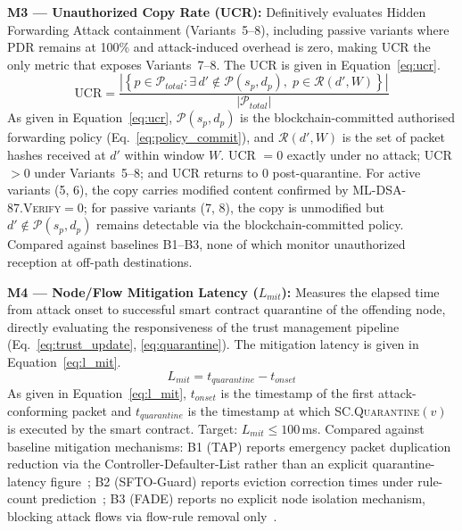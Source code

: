 \documentclass[12pt, a4paper]{report}
\begin{document}
{{%

\textbf{M3 — Unauthorized Copy Rate (UCR):}
Definitively evaluates Hidden Forwarding Attack
containment (Variants~5--8), including passive variants
where \ac{PDR} remains at 100\% and attack-induced
overhead is zero, making UCR the only metric that
exposes Variants~7--8. The UCR is given in
Equation~\eqref{eq:ucr}.
\begin{equation}
\text{UCR} =
\frac{\left|\left\{
p \in \mathcal{P}_{total} :
\exists\, d' \notin \mathcal{P}(s_p, d_p),\;
p \in \mathcal{R}(d', W)
\right\}\right|}{|\mathcal{P}_{total}|}
\label{eq:ucr}
\end{equation}
As given in Equation~\eqref{eq:ucr},
$\mathcal{P}(s_p, d_p)$ is the blockchain-committed
authorised forwarding policy (Eq.~\ref{eq:policy_commit}),
and $\mathcal{R}(d', W)$ is the set of packet hashes
received at $d'$ within window $W$. UCR $= 0$ exactly
under no attack; UCR $> 0$ under Variants~5--8;
and UCR returns to 0 post-quarantine. For active
variants (5, 6), the copy carries modified content
confirmed by \textsc{ML-DSA-87.Verify}$= 0$; for
passive variants (7, 8), the copy is unmodified
but $d' \notin \mathcal{P}(s_p, d_p)$ remains
detectable via the blockchain-committed policy.
Compared against baselines B1--B3, none of which
monitor unauthorized reception at off-path destinations.



\textbf{M4 — Node/Flow Mitigation Latency
($L_{mit}$):}
Measures the elapsed time from attack onset to
successful smart contract quarantine of the offending
node, directly evaluating the responsiveness of the
trust management pipeline
(Eq.~\ref{eq:trust_update}, \ref{eq:quarantine}).
The mitigation latency is given in
Equation~\eqref{eq:l_mit}.
\begin{equation}
L_{mit} = t_{quarantine} - t_{onset}
\label{eq:l_mit}
\end{equation}
As given in Equation~\eqref{eq:l_mit},
$t_{onset}$ is the timestamp of the first
attack-conforming packet and $t_{quarantine}$ is the
timestamp at which \textsc{SC.Quarantine}$(v)$ is
executed by the smart contract. Target: $L_{mit}
\leq 100$\,ms. Compared against baseline mitigation mechanisms:
B1 (TAP) reports emergency packet duplication
reduction via the Controller-Defaulter-List rather
than an explicit quarantine-latency
figure~\cite{Arsalan2018}; B2 (SFTO-Guard) reports
eviction correction times under rule-count
prediction~\cite{Tang2023SFTO}; B3 (FADE) reports no
explicit node isolation mechanism, blocking attack
flows via flow-rule removal
only~\cite{Zhang2021FADE}.


}}
\end{document}
